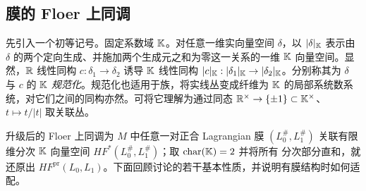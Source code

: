 \subsection{膜的 Floer 上同调}\label{sec:12e}
先引入一个初等记号。固定系数域 $\mathbb K$。对任意一维实向量空间 $\delta$，以 $|\delta|_{\mathbb K}$ 表示由 $\delta$ 的两个定向生成、并施加两个生成元之和为零这一关系的一维 $\mathbb K$ 向量空间。显然，$\mathbb R$ 线性同构 $c:\delta_1\to\delta_2$ 诱导 $\mathbb K$ 线性同构 $|c|_{\mathbb K}:|\delta_1|_{\mathbb K}\to|\delta_2|_{\mathbb K}$。分别称其为 $\delta$ 与 $c$ 的 $\mathbb K$ \emph{规范化}。规范化也适用于族，将实线丛变成纤维为 $\mathbb K$ 的局部系统数系统，对它们之间的同构亦然。可将它理解为通过同态 $\mathbb R^\times\to\{\pm1\}\subset\mathbb K^\times$、$t\mapsto t/|t|$ 取关联丛。

升级后的 Floer 上同调为 $M$ 中任意一对正合 Lagrangian 膜 $(L_0^\#,\allowbreak L_1^\#)$ 关联有限维分次 $\mathbb K$ 向量空间 $HF^*(L_0^\#,\allowbreak L_1^\#)$；取 $\operatorname{char}(\mathbb K)=2$ 并将所有
分次部分直和，就还原出 $HF^{\mathrm{pr}}(L_0,\allowbreak L_1)$。下面回顾讨论的若干基本性质，并说明有膜结构时如何适配。
